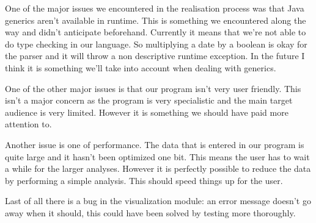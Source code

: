 One of the major issues we encountered in the realisation process was that Java generics aren't available in runtime. This is something we encountered along the way and didn't anticipate beforehand. Currently it means that we're not able to do type checking in our language. So multiplying a date by a boolean is okay for the parser and it will throw a non descriptive runtime exception. In the future I think it is something we'll take into account when dealing with generics.

One of the other major issues is that our program isn't very user friendly. This isn't a major concern as the program is very specialistic and the main target audience is very limited. However it is something we should have paid more attention to. 

Another issue is one of performance. The data that is entered in our program is quite large and it  hasn't been optimized one bit. This means the user has to wait a while for the larger analyses. However it is perfectly possible to reduce the data by performing a simple analysis. This should speed things up for the user.

Last of all there is a bug in the visualization module: an error message doesn't go away when it should, this could have been solved by testing more thoroughly.
